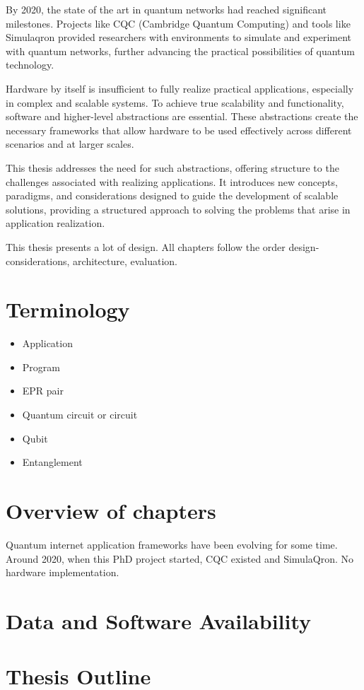 By 2020, the state of the art in quantum networks had reached significant milestones.
Projects like CQC (Cambridge Quantum Computing) and tools like Simulaqron provided researchers with environments to simulate and experiment with quantum networks, further advancing the practical possibilities of quantum technology.



Hardware by itself is insufficient to fully realize practical applications, especially in complex and scalable systems.
To achieve true scalability and functionality, software and higher-level abstractions are essential.
These abstractions create the necessary frameworks that allow hardware to be used effectively across different scenarios and at larger scales.

This thesis addresses the need for such abstractions, offering structure to the challenges associated with realizing applications.
It introduces new concepts, paradigms, and considerations designed to guide the development of scalable solutions, providing a structured approach to solving the problems that arise in application realization.



This thesis presents a lot of design.
All chapters follow the order design-considerations, architecture, evaluation.


\section{Terminology}
\begin{itemize}
  \item Application
  \item Program
  \item EPR pair
  \item Quantum circuit or circuit
  \item Qubit
  \item Entanglement
\end{itemize}

\section{Overview of chapters}
Quantum internet application frameworks have been evolving for some time.
Around 2020, when this PhD project started, CQC existed and SimulaQron.
No hardware implementation.


\section{Data and Software Availability}
\lipsum[51]


\section{Thesis Outline}
\lipsum[52]


\begin{xstretch}
\printbibliography[heading=subbibintoc,title={References},notcategory=noprint]
\end{xstretch}
